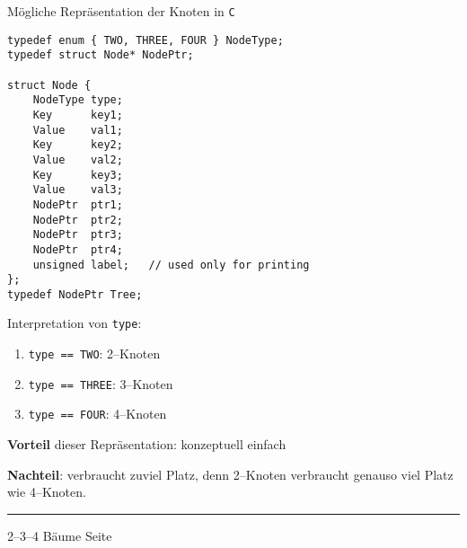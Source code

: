\begin{slide}{}
\normalsize

\begin{center}
M\"ogliche Repr\"asentation der Knoten in \texttt{C}
\end{center}
\vspace*{0.5cm}

\footnotesize
\begin{verbatim}
typedef enum { TWO, THREE, FOUR } NodeType;
typedef struct Node* NodePtr;

struct Node {
    NodeType type;
    Key      key1;
    Value    val1;
    Key      key2;
    Value    val2;
    Key      key3;
    Value    val3;
    NodePtr  ptr1;
    NodePtr  ptr2;
    NodePtr  ptr3;
    NodePtr  ptr4;
    unsigned label;   // used only for printing
};
typedef NodePtr Tree;
\end{verbatim}
Interpretation von \texttt{type}:
\begin{enumerate}
\item \texttt{type == TWO}:   2--Knoten
\item \texttt{type == THREE}: 3--Knoten
\item \texttt{type == FOUR}:  4--Knoten
\end{enumerate}

\textbf{Vorteil} dieser Repr\"asentation: konzeptuell einfach

\textbf{Nachteil}: verbraucht zuviel Platz, denn 2--Knoten
verbraucht genauso viel Platz wie 4--Knoten.


\vspace*{\fill}
\tiny \addtocounter{mypage}{1}
\rule{17cm}{1mm}
2--3--4 B\"aume  \hspace*{\fill} Seite 
\end{slide}


